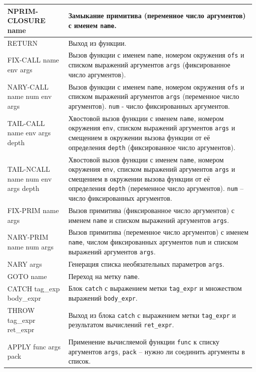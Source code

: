 \begin{xltabular}{\textwidth}{|p{6cm}|X|}
	\hline NPRIM-CLOSURE name & Замыкание примитива (переменное число аргументов) с именем \texttt{name}. \\
	\hline RETURN & Выход из функции. \\
	\hline FIX-CALL name env args & Вызов функции с именем \texttt{name}, номером окружения \texttt{ofs} и списком выражений аргументов \texttt{args} (фиксированное число аргументов). \\
	\hline NARY-CALL name num env args & Вызов функции с именем \texttt{name}, номером окружения \texttt{ofs} и списком выражений аргументов \texttt{args} (переменное число аргументов). \texttt{num} - число фиксированных аргументов. \\
	\hline TAIL-CALL name env args depth & Хвостовой вызов функции с именем \texttt{name}, номером окружения \texttt{env}, списком выражений аргументов \texttt{args} и смещением в окружении вызова функции от её определения \texttt{depth} (фиксированное число аргументов). \\
	\hline TAIL-NCALL name num env args depth & Хвостовой вызов функции с именем \texttt{name}, номером окружения \texttt{env}, списком выражений аргументов \texttt{args} и смещением в окружении вызова функции от её определения \texttt{depth} (переменное число аргументов). \texttt{num} -- число фиксированных аргументов. \\
	\hline FIX-PRIM name args & Вызов примитива (фиксированное число аргументов) с именем \texttt{name} и списком выражений аргументов \texttt{args}. \\
	\hline NARY-PRIM name num args & Вызов примитива (переменное число аргументов) с именем \texttt{name}, числом фиксированных аргументов \texttt{num} и списком выражений аргументов \texttt{args}. \\
	\hline NARY args & Генерация списка необязательных параметров \texttt{args}. \\
	\hline GOTO name & Переход на метку \texttt{name}. \\
	\hline CATCH tag\_exp body\_expr & Блок \texttt{catch} с выражением метки \texttt{tag\_expr} и множеством выражений \texttt{body\_expr}. \\
	\hline THROW tag\_expr ret\_expr & Выход из блока \texttt{catch} с выражением метки \texttt{tag\_expr} и результатом вычислений \texttt{ret\_expr}. \\
	\hline APPLY func args pack & Применение вычисляемой функции \texttt{func} к списку аргументов \texttt{args}, \texttt{pack} -- нужно ли соединить аргументы в список. \\
\end{xltabular}
\renewcommand{\arraystretch}{1.0} %


